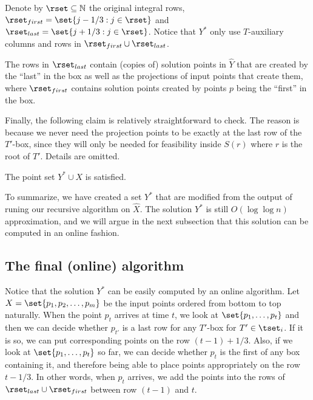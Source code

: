 \documentclass{toc}
\begin{document}
Denote by $\rset \subseteq {\mathbb N}$ the original integral rows, $\rset_{first}=\set{j - 1/3: j \in \rset}$ and $\rset_{last} = \set{j + 1/3: j \in \rset}$.
Notice that $Y^*$ only use $T$-auxiliary columns and rows in $\rset_{first} \cup \rset_{last}$.

\begin{observation}
The rows in $\rset_{last}$ contain (copies of) solution points in $\hat{Y}$ that are created by the ``last'' in the box as well as the projections of input points that create them, where $\rset_{first}$ contains solution points created by points $p$ being the ``first'' in the box.  
\end{observation}  

Finally, the following claim is relatively straightforward to check. The reason is because we never need the projection points to be exactly at the last row of the $T'$-box, since they will only be needed for feasibility inside $S(r)$ where $r$ is the root of $T'$. 
Details are omitted. 

\begin{claim}
The point set $Y^* \cup X$ is satisfied. 
\end{claim}  

To summarize, we have created a set $Y^*$ that are modified from the output of runing our recursive algorithm on $\hat{X}$. 
The solution $Y^*$ is still $O(\log \log n)$ approximation, and we will argue in the next subsection that this solution can be computed in an online fashion.  
   

\subsection{The final (online) algorithm}  
\label{subsec: online alg}

Notice that the solution $Y^*$ can be easily computed by an online algorithm. Let $X= \set{p_1,p_2,\ldots, p_m}$ be the input points ordered from bottom to top naturally.  
When the point $p_t$ arrives at time $t$, we look at $\set{p_1,\ldots, p_t}$ and then we can decide whether $p_{t'}$ is a last row for any $T'$-box for $T' \in \tset_i$. 
If it is so, we can put corresponding points on the row $(t-1) + 1/3$. 
Also, if we look at $\set{p_1,\ldots, p_t}$ so far, we can decide whether $p_t$ is the first of any box containing it, and therefore being able to place points appropriately on the row $t - 1/3$.  
In other words, when $p_t$ arrives, we add the points into the rows of $\rset_{last} \cup \rset_{first}$ between row $(t-1)$ and $t$.    
 
\end{document}
